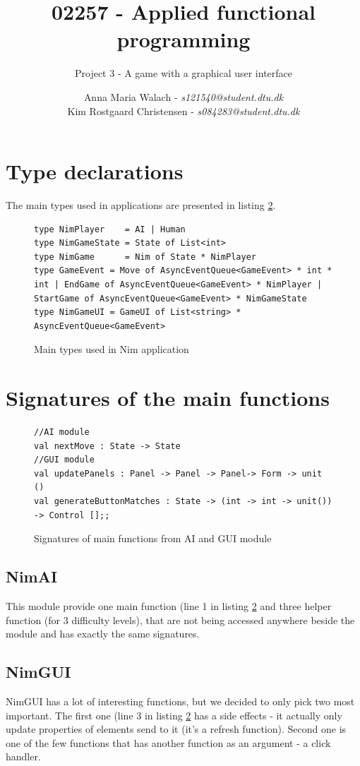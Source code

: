 \documentclass[10pt]{scrartcl}
\title{02257 - Applied functional programming}
\subtitle{Project 3 - A game with a graphical user interface}
\author{Anna Maria Walach - \textit {s121540@student.dtu.dk} \\ Kim Rostgaard Christensen - \textit {s084283@student.dtu.dk}}
\begin{document}
\maketitle
\section{Type declarations}
The main types used in applications are presented in listing \ref{list:types}. 
\begin{figure} [!ht]
\begin{lstlisting}
type NimPlayer    = AI | Human
type NimGameState = State of List<int>
type NimGame      = Nim of State * NimPlayer
type GameEvent = Move of AsyncEventQueue<GameEvent> * int * int | EndGame of AsyncEventQueue<GameEvent> * NimPlayer | StartGame of AsyncEventQueue<GameEvent> * NimGameState
type NimGameUI = GameUI of List<string> * AsyncEventQueue<GameEvent>

\end{lstlisting}
\caption{Main types used in Nim application}
\label{list:types}
\end{figure}
\section{Signatures of the main functions}
\begin{figure} [!ht]
\begin{lstlisting}
//AI module
val nextMove : State -> State
//GUI module
val updatePanels : Panel -> Panel -> Panel-> Form -> unit ()
val generateButtonMatches : State -> (int -> int -> unit()) -> Control [];;
\end{lstlisting}
\caption{Signatures of main functions from AI and GUI module}
\label{list:types}
\end{figure}
\subsection{NimAI}
This module provide one main function (line 1 in listing \ref{list:types} and three helper function (for 3 difficulty levels), that are not being accessed anywhere beside the module and has exactly the same signatures. 
\subsection{NimGUI}
NimGUI has a lot of interesting functions, but we decided to only pick two most important. The first one (line 3 in listing \ref{list:types} has a side effects - it actually only update properties of elements send to it (it's a refresh function). Second one is one of the few functions that has another function as an argument - a click handler.
\end{document}
